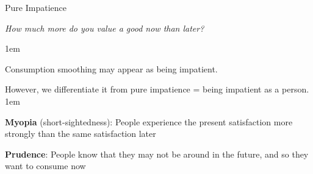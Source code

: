 \documentclass[11pt,aspectratio=43,usenames,dvipsnames]{beamer}
\let\olditemize=\itemize
\let\endolditemize=\enditemize
\renewenvironment{itemize}{\olditemize \itemsep1em}{\endolditemize}
\theoremstyle{definition}
\begin{document}
\begin{frame}{Pure Impatience}
\label{slide:Pure_Impatience}

        \begin{center}
            \textit{How much more do you value a good now than later?}
        \end{center}

        \vspace{1em}

    \begin{itemize}
        \item Consumption smoothing may appear as being impatient.
        \item However, we differentiate it from pure impatience = being impatient as a person.
        \begin{itemize}
            \item \textbf{Myopia} (short-sightedness): People experience the present satisfaction more strongly than the same satisfaction later
            \item \textbf{Prudence}: People know that they may not be around in the future, and so they want to consume now
        \end{itemize}


    \end{itemize}
\end{frame}
\end{document}
